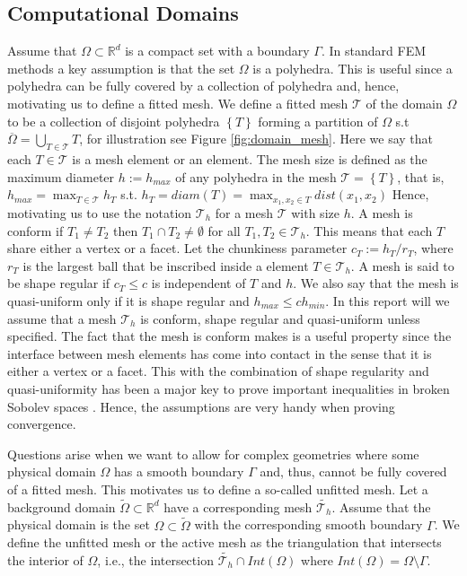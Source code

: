 \subsection{Computational Domains}%
\label{sub:computational_domain}
Assume that $\Omega \subset \mathbb{R} ^{d} $ is a compact set with a boundary  $\Gamma $. In standard FEM methods a key assumption is that the set $\Omega $ is a polyhedra. This is useful since a polyhedra can be fully covered by a collection of polyhedra and, hence, motivating us to define a fitted mesh.
We define a fitted mesh $\mathcal{T} $ of the domain $\Omega $ to be a collection of disjoint polyhedra $\left\{ T \right\}  $ forming a partition of $\Omega $ s.t $\overline{\Omega } = \bigcup _{T \in \mathcal{T} } T $, for illustration see Figure
\ref{fig:domain_mesh}.
Here we say that each $T \in  \mathcal{T} $ is a mesh element or an element.
The mesh size is defined as the maximum diameter $h := h_{max} $ of any polyhedra in the mesh $\mathcal{T} = \left\{ T \right\}  $, that is, $ h_{max} = \max_{T \in \mathcal{T} }  h_{T}$ s.t.
    $h _{T}  = diam\left( T \right)   = \max_{x_1, x_{2} \in T} dist(x_{1}, x_{2})$
Hence, motivating us to use the notation $\mathcal{T} _{h}$ for a mesh $\mathcal{T} $ with size $h$.
 A mesh is conform if $T_{1} \neq T_{2 }$  then $T_{1} \cap T_{2} \neq \emptyset  $ for all $T_{1}, T_{2} \in \mathcal{T}_{h}$. This means that each $T$ share either a vertex or a facet.
Let the chunkiness parameter $c_{T} := h_{T}/r_{T}$, where $r_{T}$  is the largest ball that be inscribed inside a element $T \in \mathcal{T}_{h} $.
A mesh is said to be shape regular if $c_{T}\le  c$ is independent of $T$  and $h$. We also say that the mesh is quasi-uniform only if it is shape regular and $h_{max} \le  c h_{min}$.
In this report will we assume that a mesh $\mathcal{T}_{h} $ is conform, shape regular and quasi-uniform unless specified.
 The fact that the mesh is conform makes is a useful property since the interface between mesh elements has come into contact in the sense
that it is either a vertex or a facet. This with the combination of shape regularity and quasi-uniformity has been a major key to prove important inequalities in broken Sobolev spaces \cite[Chapter 1.4.1]{pietro2012}. Hence, the assumptions are very handy when proving convergence.

Questions arise when we want to allow for complex geometries where some physical domain $\Omega $ has a smooth boundary $\Gamma $ and, thus, cannot be fully covered of a fitted mesh. This motivates us to define a so-called unfitted mesh.
 Let a background domain $\widetilde{\Omega } \subset \mathbb{R} ^{d} $ have a corresponding mesh $\widetilde{\mathcal{T} _{h}}$.
Assume that the physical domain is the set $\Omega\subset   \widetilde{\Omega }  $ with the corresponding smooth boundary $\Gamma$. We define the unfitted mesh or the active mesh as the triangulation that intersects the interior of $\Omega$, i.e., the intersection $\widetilde{\mathcal{T}_{h} } \cap
 Int(\Omega )     $ where $ Int( \Omega )  = \Omega \setminus \Gamma  $.


